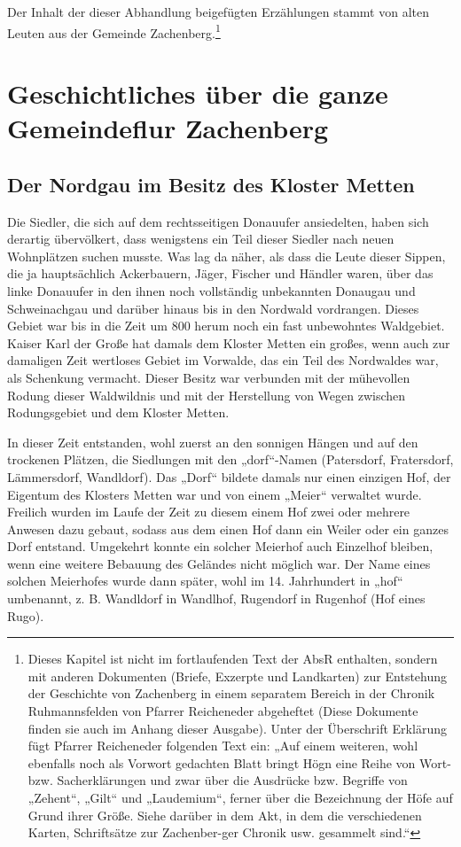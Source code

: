 \documentclass[12pt,a4pager,draft]{book}
\begin{document}
Der Inhalt der dieser Abhandlung beigefügten Erzählungen stammt von alten Leuten
aus der Gemeinde Zachenberg.\footnote{Dieses Kapitel ist nicht im fortlaufenden
Text der AbsR enthalten, sondern mit anderen Dokumenten (Briefe, Exzerpte und
Landkarten) zur Entstehung der Geschichte von Zachenberg in einem separatem
Bereich in der Chronik Ruhmannsfelden von Pfarrer Reicheneder abgeheftet (Diese
Dokumente finden sie auch im Anhang dieser Ausgabe). Unter der Überschrift
Erklärung fügt Pfarrer Reicheneder folgenden Text ein: „Auf einem weiteren, wohl
ebenfalls noch als Vorwort gedachten Blatt bringt Högn eine Reihe von Wort- bzw.
Sacherklärungen und zwar über die Ausdrücke bzw. Begriffe von „Zehent“,  „Gilt“
und „Laudemium“, ferner über die Bezeichnung der Höfe auf Grund ihrer Größe.
Siehe darüber in dem Akt, in dem die verschiedenen Karten, Schriftsätze zur
Zachenber-ger Chronik usw. gesammelt sind.“}

\chapter[Die ganze Gemeindeflur]{Geschichtliches über die ganze Gemeindeflur
Zachenberg}

\section{Der Nordgau im Besitz des Kloster Metten}

Die Siedler, die sich auf dem rechtsseitigen Donauufer ansiedelten, haben sich
derartig übervölkert, dass wenigstens ein Teil dieser Siedler nach neuen
Wohnplätzen suchen musste. Was lag da näher, als dass die Leute dieser Sippen,
die ja hauptsächlich Ackerbauern, Jäger, Fischer und Händler waren, über das
linke Donauufer in den ihnen noch vollständig unbekannten Donaugau und
Schweinachgau und darüber hinaus bis in den Nordwald vordrangen. Dieses Gebiet
war bis in die Zeit um 800 herum noch ein fast unbewohntes Waldgebiet. Kaiser
Karl der Große hat damals dem Kloster Metten ein großes, wenn auch zur damaligen
Zeit wertloses Gebiet im Vorwalde, das ein Teil des Nordwaldes war, als
Schenkung vermacht. Dieser Besitz war verbunden mit der mühevollen Rodung dieser
Waldwildnis und mit der Herstellung von Wegen zwischen Rodungsgebiet und dem
Kloster Metten.

In dieser Zeit entstanden, wohl zuerst an den sonnigen Hängen und auf den
trockenen Plätzen, die Siedlungen mit den „dorf“-Namen (Patersdorf, Fratersdorf,
Lämmersdorf, Wandldorf). Das „Dorf“ bildete damals nur einen einzigen Hof, der
Eigentum des Klosters Metten war und von einem „Meier“ verwaltet wurde. Freilich
wurden im Laufe der Zeit zu diesem einem Hof zwei oder mehrere Anwesen dazu
gebaut, sodass aus dem einen Hof dann ein Weiler oder ein ganzes Dorf entstand.
Umgekehrt konnte ein solcher Meierhof auch Einzelhof bleiben, wenn eine weitere
Bebauung des Geländes nicht möglich war. Der Name eines solchen Meierhofes wurde
dann später, wohl im 14. Jahrhundert in „hof“ umbenannt, z. B. Wandldorf in
Wandlhof, Rugendorf in Rugenhof (Hof eines Rugo).
\end{document}
